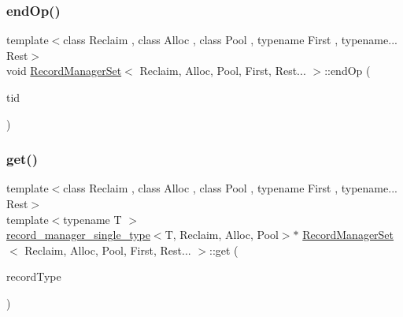 \mbox{\label{classRecordManagerSet_3_01Reclaim_00_01Alloc_00_01Pool_00_01First_00_01Rest_8_8_8_01_4_a11af9e5ade9a64b64710320d1b0ea9f7}} 
\subsubsection{\texorpdfstring{end\+Op()}{endOp()}}
{\footnotesize\ttfamily template$<$class Reclaim , class Alloc , class Pool , typename First , typename... Rest$>$ \\
void \hyperlink{classRecordManagerSet}{Record\+Manager\+Set}$<$ Reclaim, Alloc, Pool, First, Rest... $>$\+::end\+Op (\begin{DoxyParamCaption}\item[{const int}]{tid }\end{DoxyParamCaption})\hspace{0.3cm}{\ttfamily [inline]}}

\mbox{\label{classRecordManagerSet_3_01Reclaim_00_01Alloc_00_01Pool_00_01First_00_01Rest_8_8_8_01_4_ad755746ae5e804082f4373331dc9f516}} 
\subsubsection{\texorpdfstring{get()}{get()}}
{\footnotesize\ttfamily template$<$class Reclaim , class Alloc , class Pool , typename First , typename... Rest$>$ \\
template$<$typename T $>$ \\
\hyperlink{classrecord__manager__single__type}{record\+\_\+manager\+\_\+single\+\_\+type}$<$T, Reclaim, Alloc, Pool$>$$\ast$ \hyperlink{classRecordManagerSet}{Record\+Manager\+Set}$<$ Reclaim, Alloc, Pool, First, Rest... $>$\+::get (\begin{DoxyParamCaption}\item[{T $\ast$const}]{record\+Type }\end{DoxyParamCaption})\hspace{0.3cm}{\ttfamily [inline]}}

